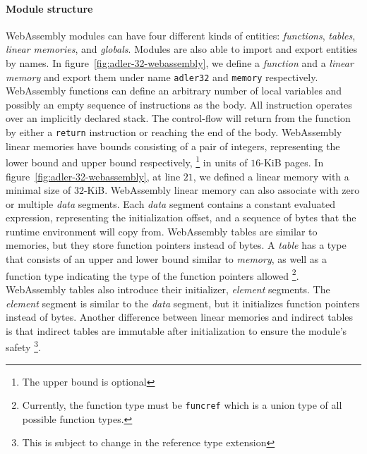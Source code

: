 \paragraph{Module structure}
WebAssembly modules can have four different kinds of entities: \emph{functions},
\emph{tables}, \emph{linear memories}, and \emph{globals}. Modules are also able
to import and export entities by names. In
figure~\ref{fig:adler-32-webassembly}, we define a \emph{function} and a
\emph{linear memory} and export them under name \texttt{adler32} and
\texttt{memory} respectively. WebAssembly functions can define an arbitrary
number of local variables and possibly an empty sequence of instructions as the
body. All instruction operates over an implicitly declared stack. The
control-flow will return from the function by either a \texttt{return}
instruction or reaching the end of the body. WebAssembly linear memories have
bounds consisting of a pair of integers, representing the lower bound and upper
bound respectively, \footnote{The upper bound is optional} in units of $16$-KiB
pages. In figure~\ref{fig:adler-32-webassembly}, at line $21$, we defined a
linear memory with a minimal size of $32$-KiB. WebAssembly linear memory can
also associate with zero or multiple \emph{data} segments. Each \emph{data}
segment contains a constant evaluated expression, representing the
initialization offset, and a sequence of bytes that the runtime environment will
copy from. WebAssembly tables are similar to memories, but they store function
pointers instead of bytes. A \emph{table} has a type that consists of an upper
and lower bound similar to \emph{memory}, as well as a function type indicating
the type of the function pointers allowed \footnote{Currently, the function type
  must be \texttt{funcref} which is a union type of all possible function
  types.}. WebAssembly tables also introduce their initializer, \emph{element}
segments. The \emph{element} segment is similar to the \emph{data} segment, but
it initializes function pointers instead of bytes. Another difference between
linear memories and indirect tables is that indirect tables are immutable after
initialization to ensure the module's safety \footnote{This is subject to change
  in the reference type extension}.

